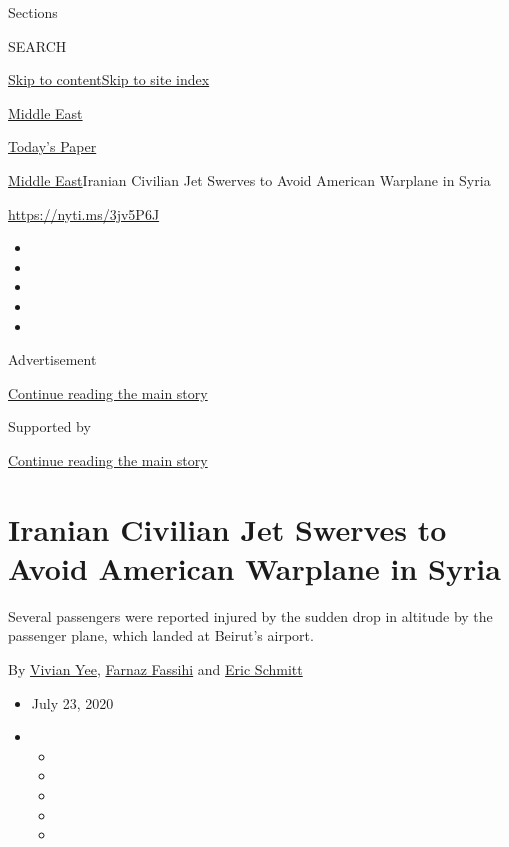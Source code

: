 Sections

SEARCH

\protect\hyperlink{site-content}{Skip to
content}\protect\hyperlink{site-index}{Skip to site index}

\href{https://www.nytimes.com/section/world/middleeast}{Middle East}

\href{https://myaccount.nytimes.com/auth/login?response_type=cookie\&client_id=vi}{}

\href{https://www.nytimes.com/section/todayspaper}{Today's Paper}

\href{/section/world/middleeast}{Middle East}\textbar{}Iranian Civilian
Jet Swerves to Avoid American Warplane in Syria

\url{https://nyti.ms/3jv5P6J}

\begin{itemize}
\item
\item
\item
\item
\item
\end{itemize}

Advertisement

\protect\hyperlink{after-top}{Continue reading the main story}

Supported by

\protect\hyperlink{after-sponsor}{Continue reading the main story}

\hypertarget{iranian-civilian-jet-swerves-to-avoid-american-warplane-in-syria}{%
\section{Iranian Civilian Jet Swerves to Avoid American Warplane in
Syria}\label{iranian-civilian-jet-swerves-to-avoid-american-warplane-in-syria}}

Several passengers were reported injured by the sudden drop in altitude
by the passenger plane, which landed at Beirut's airport.

By \href{https://www.nytimes.com/by/vivian-yee}{Vivian Yee},
\href{https://www.nytimes.com/by/farnaz-fassihi}{Farnaz Fassihi} and
\href{https://www.nytimes.com/by/eric-schmitt}{Eric Schmitt}

\begin{itemize}
\item
  July 23, 2020
\item
  \begin{itemize}
  \item
  \item
  \item
  \item
  \item
  \end{itemize}
\end{itemize}

